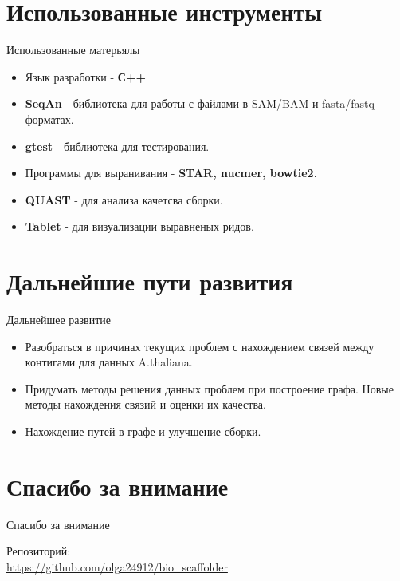 \documentclass{beamer}
\newcommand{\cimg}[2]{%
	\begin{center}%
		\ifthenelse{\equal{#2}{}}{%
			\texttt{[image: \#1]}
		}{%
			\texttt{[image: \#1]}
		}%
	\end{center}%
}
\begin{document}
\section{Использованные инструменты}
\begin{frame}[t]{Использованные матерьялы}
\begin{itemize}
	\item Язык разработки - \textbf{С++}
	\item \textbf{SeqAn} - библиотека для работы с 
	файлами в SAM/BAM и fasta/fastq форматах.  
	\item \textbf{gtest} - библиотека для тестирования.
	\item Программы для выранивания - \textbf{STAR, nucmer, bowtie2}. 
	\item \textbf{QUAST} - для анализа качетсва сборки. 
	\item \textbf{Tablet} - для визуализации выравненых ридов. 
\end{itemize}
\end{frame}

\section{Дальнейшие пути развития}
\begin{frame}[t]{Дальнейшее развитие}
\begin{itemize}
\item Разобраться в причинах текущих 
проблем с нахождением связей между 
контигами для данных A.thaliana.  
\cimg{athaliana.jpg}{0.20}
\item Придумать методы решения данных проблем при построение графа. Новые методы нахождения связий и оценки их качества. 
\item Нахождение путей в графе и улучшение сборки. 
\end{itemize}
\end{frame}

\section{Спасибо за внимание}
\begin{frame}{Спасибо за внимание}
    \begin{center}
        Репозиторий: \\ \url{https://github.com/olga24912/bio_scaffolder}
    \end{center}
\end{frame}
\end{document}
